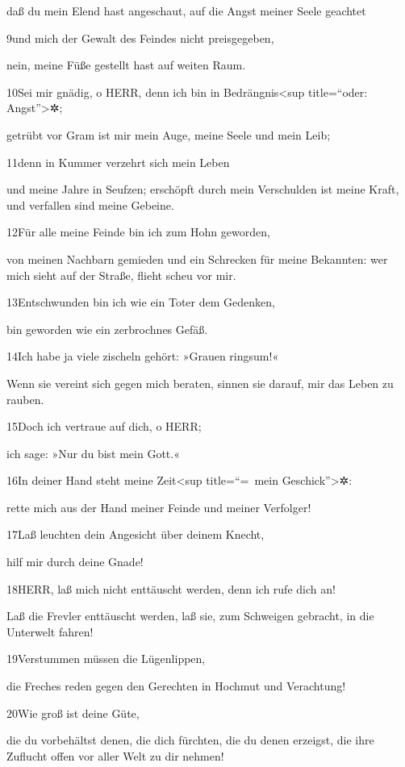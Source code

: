 daß du mein Elend hast angeschaut, auf die Angst meiner Seele geachtet

9und mich der Gewalt des Feindes nicht preisgegeben,

nein, meine Füße gestellt hast auf weiten Raum.

10Sei mir gnädig, o HERR, denn ich bin in Bedrängnis\textless sup
title=``oder: Angst''\textgreater✲;

getrübt vor Gram ist mir mein Auge, meine Seele und mein Leib;

11denn in Kummer verzehrt sich mein Leben

und meine Jahre in Seufzen; erschöpft durch mein Verschulden ist meine
Kraft, und verfallen sind meine Gebeine.

12Für alle meine Feinde bin ich zum Hohn geworden,

von meinen Nachbarn gemieden und ein Schrecken für meine Bekannten: wer
mich sieht auf der Straße, flieht scheu vor mir.

13Entschwunden bin ich wie ein Toter dem Gedenken,

bin geworden wie ein zerbrochnes Gefäß.

14Ich habe ja viele zischeln gehört: »Grauen ringsum!«

Wenn sie vereint sich gegen mich beraten, sinnen sie darauf, mir das
Leben zu rauben.

15Doch ich vertraue auf dich, o HERR;

ich sage: »Nur du bist mein Gott.«

16In deiner Hand steht meine Zeit\textless sup title=``=~mein
Geschick''\textgreater✲:

rette mich aus der Hand meiner Feinde und meiner Verfolger!

17Laß leuchten dein Angesicht über deinem Knecht,

hilf mir durch deine Gnade!

18HERR, laß mich nicht enttäuscht werden, denn ich rufe dich an!

Laß die Frevler enttäuscht werden, laß sie, zum Schweigen gebracht, in
die Unterwelt fahren!

19Verstummen müssen die Lügenlippen,

die Freches reden gegen den Gerechten in Hochmut und Verachtung!

20Wie groß ist deine Güte,

die du vorbehältst denen, die dich fürchten, die du denen erzeigst, die
ihre Zuflucht offen vor aller Welt zu dir nehmen!

